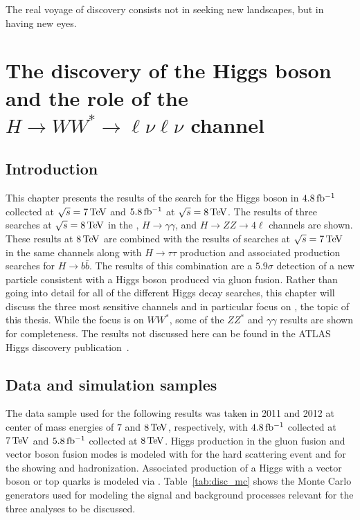 \begin{savequote}[75mm]
The real voyage of discovery consists not in seeking new landscapes, but in having new eyes.
\end{savequote}

\chapter{The discovery of the Higgs boson and the role of the $H\rightarrow WW^{*}\rightarrow \ell\nu\ell\nu$ channel}

\section{Introduction}

This chapter presents the results of the search for the Higgs boson in $4.8 \mbox{\,fb$^{-1}$}$ collected at $\sqrt{s} = 7 \TeV$ and $5.8 \mbox{\,fb$^{-1}$}$ at $\sqrt{s} = 8 \TeV$. The results of three searches at $\sqrt{s} = 8 \TeV$ in the \HWWfull, $H\to \gamma \gamma$, and $H\to ZZ \to 4\ell$ channels are shown. These results at $8 \TeV$ are combined with the results of searches at $\sqrt{s} = 7 \TeV$ in the same channels along with $H\to\tau\tau$ production and associated production searches for $H\to b\bar{b}$. The results of this combination are a $5.9 \sigma$ detection of a new particle consistent with a Higgs boson produced via gluon fusion. Rather than going into detail for all of the different Higgs decay searches, this chapter will discuss the three most sensitive channels and in particular focus on \HWWfull, the topic of this thesis. While the focus is on $WW^*$, some of the $ZZ^*$ and $\gamma\gamma$ results are shown for completeness. The results not discussed here can be found in the ATLAS Higgs discovery publication~\cite{Discovery}.


\section{Data and simulation samples}

The data sample used for the following results was taken in 2011 and 2012 at center of mass energies of $7$ and $8 \TeV$, respectively, with $4.8 \mbox{\,fb$^{-1}$}$ collected at $7 \TeV$ and $5.8 \mbox{\,fb$^{-1}$}$ collected at $8 \TeV$. Higgs production in the gluon fusion and vector boson fusion modes is modeled with \POWHEG for the hard scattering event and \PYTHIA for the showing and hadronization. Associated production of a Higgs with a vector boson or top quarks is modeled via \PYTHIA. Table~\ref{tab:disc_mc} shows the Monte Carlo generators used for modeling the signal and background processes relevant for the three analyses to be discussed. 

